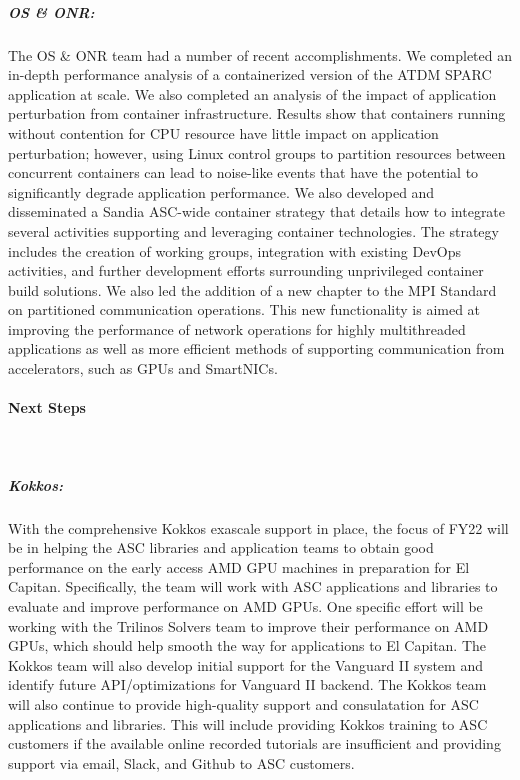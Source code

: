 \subparagraph{OS \& ONR:} The OS \& ONR team had a number of recent accomplishments. We completed an in-depth performance analysis of a containerized version of the ATDM SPARC application at scale. We also completed an analysis of the impact of application perturbation from container infrastructure. Results show that containers running without contention for CPU resource have little impact on application perturbation; however, using Linux control groups to partition resources between concurrent containers can lead to noise-like events that have the potential to significantly degrade application performance. We also developed and disseminated a Sandia ASC-wide container strategy that details how to integrate several activities supporting and leveraging container technologies. The strategy includes the creation of working groups, integration with existing DevOps activities, and further development efforts surrounding unprivileged container build solutions. We also led the addition of a new chapter to the MPI Standard on partitioned communication operations. This new functionality is aimed at improving the performance of network operations for highly multithreaded applications as well as more efficient methods of supporting communication from accelerators, such as GPUs and SmartNICs.


\paragraph{Next Steps} \leavevmode \\

\subparagraph{Kokkos: } With the comprehensive Kokkos exascale support in place, the focus of FY22 will be in helping the ASC libraries and application teams to obtain good performance on the early access AMD GPU machines in preparation for El Capitan.  Specifically, the team will work with ASC applications and libraries to evaluate and improve performance on AMD GPUs.  One specific effort will be working with the Trilinos Solvers team to improve their performance on AMD GPUs, which should help smooth the way for applications to El Capitan.  The Kokkos team will also develop initial support for the Vanguard II system and identify future API/optimizations for Vanguard II backend.  The Kokkos team will also continue to provide high-quality support and consulatation for ASC applications and libraries.  This will include providing Kokkos training to ASC customers if the available online recorded tutorials are insufficient and providing support via email, Slack, and Github to ASC customers.

